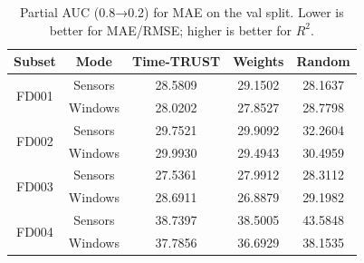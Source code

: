 \begin{table}[t]
\centering
\caption{Partial AUC (0.8→0.2) for MAE on the val split. Lower is better for MAE/RMSE; higher is better for $R^2$.}
\label{tab:auc_mae_val}
\begin{tabular}{|c|c|c|c|c|}
\hline
Subset & Mode & Time-TRUST & Weights & Random \\
\hline
\multirow{2}{*}{FD001} & Sensors & 28.5809 & 29.1502 & 28.1637 \\
 & Windows & 28.0202 & 27.8527 & 28.7798 \\
\hline
\multirow{2}{*}{FD002} & Sensors & 29.7521 & 29.9092 & 32.2604 \\
 & Windows & 29.9930 & 29.4943 & 30.4959 \\
\hline
\multirow{2}{*}{FD003} & Sensors & 27.5361 & 27.9912 & 28.3112 \\
 & Windows & 28.6911 & 26.8879 & 29.1982 \\
\hline
\multirow{2}{*}{FD004} & Sensors & 38.7397 & 38.5005 & 43.5848 \\
 & Windows & 37.7856 & 36.6929 & 38.1535 \\
\hline
\end{tabular}
\end{table}

